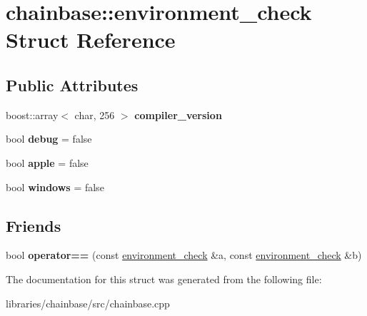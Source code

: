 \hypertarget{structchainbase_1_1environment__check}{}\section{chainbase\+:\+:environment\+\_\+check Struct Reference}
\label{structchainbase_1_1environment__check}
\subsection*{Public Attributes}
\begin{DoxyCompactItemize}
\item 
\mbox{\label{structchainbase_1_1environment__check_a3c5ddbfb9c894d50e570f32a96e1f31f}} 
boost\+::array$<$ char, 256 $>$ {\bfseries compiler\+\_\+version}
\item 
\mbox{\label{structchainbase_1_1environment__check_a374781c434cbc745a5d78a0bf3647cc4}} 
bool {\bfseries debug} = false
\item 
\mbox{\label{structchainbase_1_1environment__check_a69836e1fb5863fcd778221e181ac9b58}} 
bool {\bfseries apple} = false
\item 
\mbox{\label{structchainbase_1_1environment__check_af5db4d886c305536e6a5ebe60f349c53}} 
bool {\bfseries windows} = false
\end{DoxyCompactItemize}
\subsection*{Friends}
\begin{DoxyCompactItemize}
\item 
\mbox{\label{structchainbase_1_1environment__check_aac6cdc18e1d002145ca61131cf0a144f}} 
bool {\bfseries operator==} (const \mbox{\hyperlink{structchainbase_1_1environment__check}{environment\+\_\+check}} \&a, const \mbox{\hyperlink{structchainbase_1_1environment__check}{environment\+\_\+check}} \&b)
\end{DoxyCompactItemize}


The documentation for this struct was generated from the following file\+:\begin{DoxyCompactItemize}
\item 
libraries/chainbase/src/chainbase.\+cpp\end{DoxyCompactItemize}
